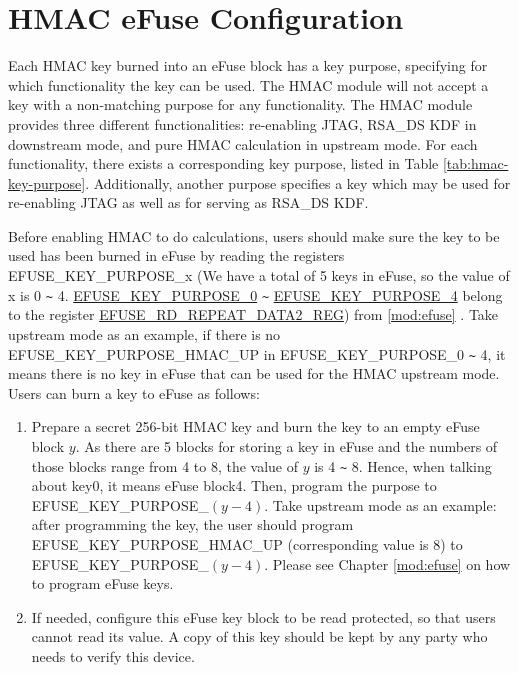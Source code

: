 \documentclass[main\_\_EN.tex]{subfiles}
\begin{document}
\section{HMAC eFuse Configuration}
\label{sec:hmac-config-function}

Each HMAC key burned into an eFuse block has a key purpose, specifying for which functionality the key can be used. The HMAC module will not accept a key with a non-matching purpose for any functionality. The HMAC module provides three different functionalities: re-enabling JTAG, RSA\_DS KDF in downstream mode, and pure HMAC calculation in upstream mode. For each functionality, there exists a corresponding key purpose, listed in Table \ref{tab:hmac-key-purpose}. Additionally, another purpose specifies a key which may be used for re-enabling JTAG as well as for serving as RSA\_DS KDF.

Before enabling HMAC to do calculations, users should make sure the key to be used has been burned in eFuse by reading the registers EFUSE\_KEY\_PURPOSE\_x (We have a total of 5 keys in eFuse, so the value of x is 0 \verb+~+ 4. \hyperref[fielddesc:EFUSEKEYPURPOSE0]{EFUSE\_KEY\_PURPOSE\_0} \verb+~+ \hyperref[fielddesc:EFUSEKEYPURPOSE4]{EFUSE\_KEY\_PURPOSE\_4} belong to the register \hyperref[regdesc:EFUSERDREPEATDATA2REG]{EFUSE\_RD\_REPEAT\_DATA2\_REG}) from \ref{mod:efuse} \textit{}. Take upstream mode as an example, if there is no EFUSE\_KEY\_PURPOSE\_HMAC\_UP in EFUSE\_KEY\_PURPOSE\_0 \verb+~+ 4, it means there is no key in eFuse that can be used for the HMAC upstream mode. Users can burn a key to eFuse as follows:

\begin{enumerate}
    \item Prepare a secret 256-bit HMAC key and burn the key to an empty eFuse block $y$. As there are 5 blocks for storing a key in eFuse and the numbers of those blocks range from 4 to 8, the value of $y$ is 4 \verb+~+ 8. Hence, when talking about key0, it means eFuse block4. Then, program the purpose to EFUSE\_KEY\_PURPOSE\_$(y-4)$. Take upstream mode as an example: after programming the key, the user should program EFUSE\_KEY\_PURPOSE\_HMAC\_UP (corresponding value is 8) to EFUSE\_KEY\_PURPOSE\_$(y-4)$. Please see Chapter \ref{mod:efuse} \textit{} on how to program eFuse keys.
    \item If needed, configure this eFuse key block to be read protected, so that users cannot read its value. A copy of this key should be kept by any party who needs to verify this device.
\end{enumerate}
\end{document}
